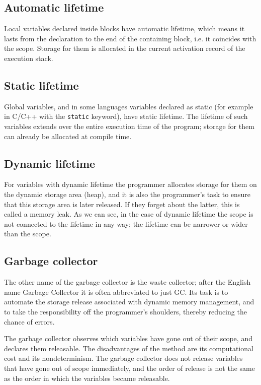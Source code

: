 \documentclass[margin=0px]{article}
\begin{document}
\subsection{Automatic lifetime}

Local variables declared inside blocks have automatic lifetime, which means it lasts from the declaration to the end of the containing block, i.e. it coincides with the scope. Storage for them is allocated in the current activation record of the execution stack.

\subsection{Static lifetime}

Global variables, and in some languages variables declared as static (for example in C/C++ with the \texttt{static} keyword), have static lifetime. The lifetime of such variables extends over the entire execution time of the program; storage for them can already be allocated at compile time.

\subsection{Dynamic lifetime}

For variables with dynamic lifetime the programmer allocates storage for them on the dynamic storage area (heap), and it is also the programmer's task to ensure that this storage area is later released. If they forget about the latter, this is called a memory leak.
As we can see, in the case of dynamic lifetime the scope is not connected to the lifetime in any way; the lifetime can be narrower or wider than the scope.

\subsection{Garbage collector}

The other name of the garbage collector is the waste collector; after the English name Garbage Collector it is often abbreviated to just GC. Its task is to automate the storage release associated with dynamic memory management, and to take the responsibility off the programmer's shoulders, thereby reducing the chance of errors.

The garbage collector observes which variables have gone out of their scope, and declares them releasable. The disadvantages of the method are its computational cost and its nondeterminism. The garbage collector does not release variables that have gone out of scope immediately, and the order of release is not the same as the order in which the variables became releasable.
\end{document}
